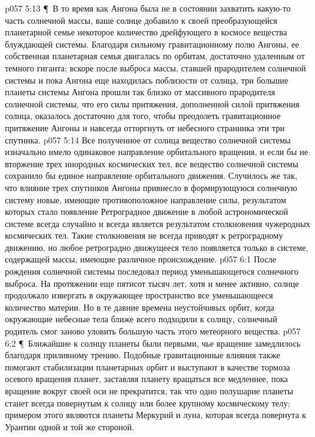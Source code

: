 \vs p057 5:13 \P\ В то время как Ангона была не в состоянии захватить какую\hyp{}то часть солнечной массы, ваше солнце добавило к своей преобразующейся планетарной семье некоторое количество дрейфующего в космосе вещества блуждающей системы. Благодаря сильному гравитационному полю Ангоны, ее собственная планетарная семья двигалась по орбитам, достаточно удаленным от темного гиганта; вскоре после выброса массы, ставшей прародителем солнечной системы и пока Ангона еще находилась поблизости от солнца, три большие планеты системы Ангона прошли так близко от массивного прародителя солнечной системы, что его силы притяжения, дополненной силой притяжения солнца, оказалось достаточно для того, чтобы преодолеть гравитационное притяжение Ангоны и навсегда отторгнуть от небесного странника эти три спутника.
\vs p057 5:14 Все полученное от солнца вещество солнечной системы изначально имело одинаковое направление орбитального вращения, и если бы не вторжение трех инородных космических тел, все вещество солнечной системы сохранило бы единое направление орбитального движения. Случилось же так, что влияние трех спутников Ангоны привнесло в формирующуюся солнечную систему новые, имеющие противоположное направление силы, результатом которых стало появление  Ретроградное движение в любой астрономической системе всегда случайно и всегда является результатом столкновения чужеродных космических тел. Такие столкновения не всегда приводят к ретроградному движению, но любое ретроградно движущееся тело появляется только в системе, содержащей массы, имеющие различное происхождение.
\vs p057 6:1 После рождения солнечной системы последовал период уменьшающегося солнечного выброса. На протяжении еще пятисот тысяч лет, хотя и менее активно, солнце продолжало извергать в окружающее пространство все уменьшающееся количество материи. Но в те давние времена неустойчивых орбит, когда окружающие небесные тела ближе всего подходили к солнцу, солнечный родитель смог заново уловить большую часть этого метеорного вещества.
\vs p057 6:2 \P\ Ближайшие к солнцу планеты были первыми, чье вращение замедлилось благодаря приливному трению. Подобные гравитационные влияния также помогают стабилизации планетарных орбит и выступают в качестве тормоза осевого вращения планет, заставляя планету вращаться все медленнее, пока вращение вокруг своей оси не прекратится, так что одно полушарие планеты станет всегда повернутым к солнцу или более крупному космическому телу; примером этого являются планеты Меркурий и луна, которая всегда повернута к Урантии одной и той же стороной.
